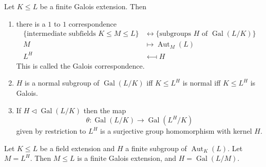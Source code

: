 \documentclass{article}
\DeclareMathOperator{\Aut}{Aut}
\DeclareMathOperator{\Gal}{Gal}
\begin{document}
\begin{nthm}\label{thm:3.2}
    Let $K \leq L$ be a finite Galois extension.
    Then
    \begin{enumerate}[label=(\roman*)]
        \item there is a $1$ to $1$ correspondence
            \begin{align*}
                \{\text{intermediate subfields }K \leq M \leq L\} &\longleftrightarrow \{\text{subgroups $H$ of } \Gal(L/K)\} \\
                M &\longmapsto \Aut_M(L) \\
                L^H &\longmapsfrom H
            \end{align*}
            This is called the Galois correspondence.
        \item $H$ is a normal subgroup of $\Gal(L/K)$ iff $K \leq L^H$ is normal iff $K \leq L^H$ is Galois.
        \item If $H \lhd \Gal(L/K)$ then the map
            \begin{equation*}
                \theta: \Gal(L/K) \longrightarrow \Gal(L^H/K)
            \end{equation*}
            given by restriction to $L^H$ is a surjective group homomorphism with kernel $H$.
    \end{enumerate}
\end{nthm}



\begin{nthm}\label{thm:3.3}
    Let $K \leq L$ be a field extension and $H$ a finite subgroup of $\Aut_K(L)$.
    Let $M = L^H$.
    Then $M \leq L$ is a finite Galois extension, and $H = \Gal(L/M)$.
\end{nthm}
\end{document}
